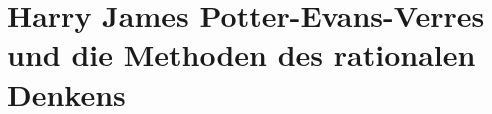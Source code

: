 \RequirePackage[pdf]{hp-book}


{
\pagestyle{empty}



% 



\cleartorecto
}
\setcounter{page}{1}

\part{Harry James Potter-Evans-Verres und die Methoden des rationalen Denkens}





















% 
% 
% 
% 
% 
% 
% 
% 
% 
% 
% 
% 
% 
% 
% 
% 
% 
% 
